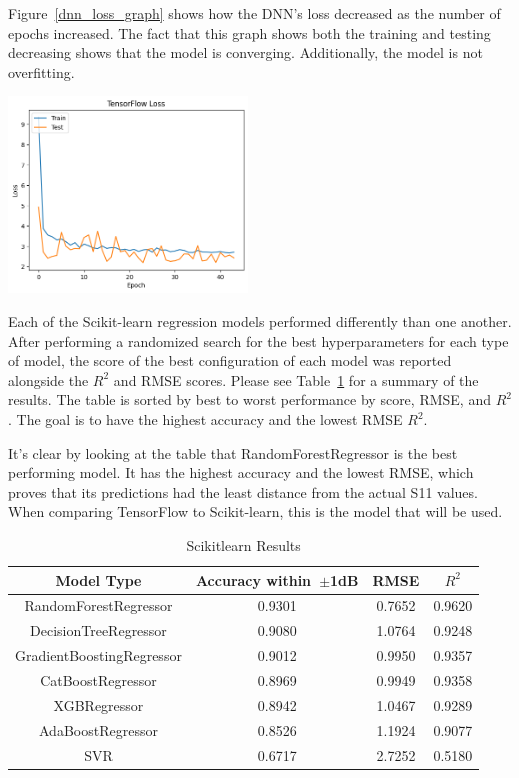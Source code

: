 \documentclass[lettersize,journal]{IEEEtran}
\newenvironment{Figure}
    {\par\medskip\noindent\minipage{\linewidth}}
    {\endminipage\par\medskip}
\begin{document}
Figure~\ref{dnn_loss_graph} shows how the DNN's loss decreased as the number of epochs increased. The fact that this graph shows both the training and testing decreasing shows that the model is converging. Additionally, the model is not overfitting. 

\begin{Figure}
    \centering
    \includegraphics[width=2.5in]{loss}
    \label{dnn_loss_graph}
\end{Figure}

Each of the Scikit-learn regression models performed differently than one another. After performing a randomized search for the best hyperparameters for each type of model, the score of the best configuration of each model was reported alongside the $R^2$ and RMSE scores. Please see Table~\ref{comparing_sklearn} for a summary of the results. The table is sorted by best to worst performance by score, RMSE, and $R^2$. The goal is to have the highest accuracy and the lowest RMSE $R^2$. 

It's clear by looking at the table that RandomForestRegressor is the best performing model. It has the highest accuracy and the lowest RMSE, which proves that its predictions had the least distance from the actual S11 values. When comparing TensorFlow to Scikit-learn, this is the model that will be used. 

\begin{table}[h]
\caption{Scikit\-learn Results}
\begin{center}
\begin{tabular}{ |c|c|c|c| }
    \hline
    Model Type & Accuracy within~$\pm$1dB & RMSE & $R^2$ \\ 
    \hline
    RandomForestRegressor & 0.9301 & 0.7652 & 0.9620 \\
    \hline  
    DecisionTreeRegressor & 0.9080 & 1.0764 & 0.9248 \\  
    \hline
    GradientBoostingRegressor & 0.9012 & 0.9950 & 0.9357 \\
    \hline
    CatBoostRegressor & 0.8969 & 0.9949 & 0.9358 \\    
    \hline
    XGBRegressor & 0.8942 & 1.0467 & 0.9289 \\  
    \hline
    AdaBoostRegressor & 0.8526 & 1.1924 & 0.9077 \\  
    \hline
    SVR & 0.6717 & 2.7252 & 0.5180 \\  
    \hline
\end{tabular}
\end{center}
\label{comparing_sklearn}
\end{table}
\end{document}
